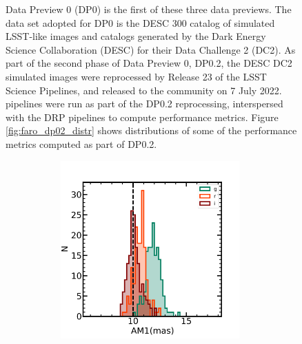 \begin{figure}[!ht]
Data Preview 0 (DP0) \cite{RTN-001} is the first of these three data previews.
The data set adopted for DP0 is the DESC 300 \degsq catalog of simulated LSST-like images and catalogs generated by the Dark Energy Science Collaboration (DESC) for their Data Challenge 2 (DC2)\cite{2021ApJS..253...31L}.
As part of the second phase of Data Preview 0, DP0.2, the DESC DC2 simulated images were reprocessed by Release 23 of the LSST Science Pipelines, and released to the community on 7 July 2022. 
\faro pipelines were run as part of the DP0.2 reprocessing, interspersed with the DRP pipelines to compute performance metrics. 
Figure \ref{fig:faro_dp02_distr} shows distributions of some of the performance metrics computed as part of DP0.2.
\begin{figure}[!htp]
\begin{subfigure}{.5\textwidth}
    \includegraphics[width=0.98\textwidth]{figures/dp02_am1_alltracts_gri}
\end{subfigure}%
\begin{subfigure}{.5\textwidth}

\end{subfigure}
\end{figure}
\end{figure}
